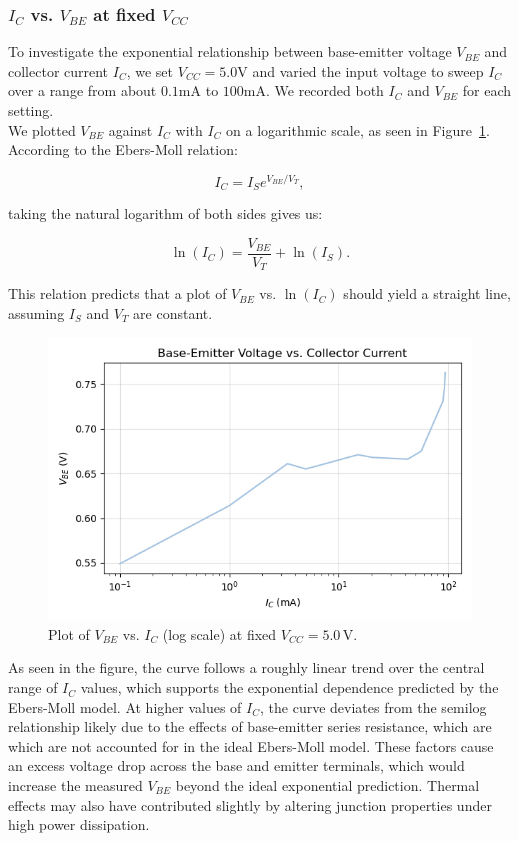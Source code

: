 \documentclass{article}
\begin{document}
\subsubsection{$I_C$ vs. $V_{BE}$ at fixed $V_{CC}$}

To investigate the exponential relationship between base-emitter voltage $V_{BE}$
and collector current $I_C$, we set $V_{CC} = 5.0\si{\volt}$ and varied the input
voltage to sweep $I_C$ over a range from about $0.1\si{\milli\ampere}$ to
$100\si{\milli\ampere}$. We recorded both $I_C$ and $V_{BE}$ for each setting.\\

\noindent We plotted $V_{BE}$ against $I_C$ with $I_C$ on a logarithmic scale, as seen
in Figure~\ref{fig:vbe_vs_ic}. According to the Ebers-Moll relation:

\begin{equation}
I_C = I_S e^{V_{BE}/V_T},
\end{equation}

\noindent taking the natural logarithm of both sides gives us:

\begin{equation}
\ln(I_C) = \frac{V_{BE}}{V_T} + \ln(I_S).
\end{equation}

\noindent This relation predicts that a plot of $V_{BE}$ vs. $\ln(I_C)$ should yield a straight line,
assuming $I_S$ and $V_T$ are constant.

\begin{figure}[H]
    \centering
    \includegraphics[width=0.75\linewidth]{5.2c.png}
    \caption{Plot of $V_{BE}$ vs. $I_C$ (log scale) at fixed $V_{CC} = 5.0\,\si{\volt}$.}
    \label{fig:vbe_vs_ic}
\end{figure}

\noindent As seen in the figure, the curve follows a roughly linear trend over the central
range of $I_C$ values, which supports the exponential dependence predicted by
the Ebers-Moll model. At higher values of $I_C$, the curve deviates from the semilog
relationship likely due to the effects of base-emitter series resistance, which are
which are not accounted for in the ideal Ebers-Moll model. These factors cause an
excess voltage drop across the base and emitter terminals, which would increase the
measured $V_{BE}$ beyond the ideal exponential prediction. Thermal effects may also
have contributed slightly by altering junction properties under high power 
dissipation.\\
\end{document}
